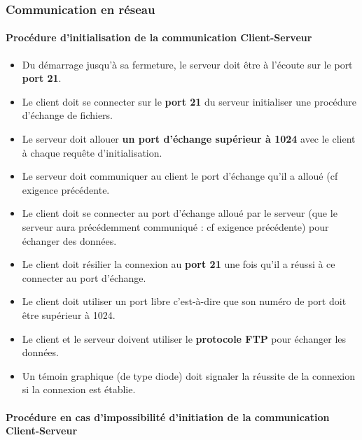 \documentclass[10pt,a4paper]{report}
\begin{document}
\subsubsection{Communication en réseau}

\paragraph{\textbf{Procédure d'initialisation de la communication Client-Serveur}}

\begin{itemize}[label = $\triangleright$]
\item  Du démarrage jusqu'à sa fermeture, le serveur doit être à l'écoute sur le port \textbf{port 21}.

\item Le client doit se connecter sur le \textbf{port 21} du serveur initialiser une procédure d'échange de fichiers.

\item Le serveur doit allouer \textbf{un port d'échange supérieur à 1024} avec le client à chaque requête d'initialisation.

\item Le serveur doit communiquer au client le port d'échange qu'il a alloué (cf exigence précédente.

\item Le client doit se connecter au port d'échange alloué par le serveur (que le serveur aura précédemment communiqué : cf exigence précédente) pour échanger des données.

\item Le client doit résilier la connexion au \textbf{port 21} une fois qu'il a réussi à ce connecter au port d'échange.

\item Le client doit utiliser un port libre c'est-à-dire que son numéro de port doit être supérieur à 1024.

\item Le client et le serveur doivent utiliser le \textbf{protocole FTP} pour échanger les données.

\item Un témoin graphique (de type diode) doit signaler la réussite de la connexion si la connexion est établie. 
\end{itemize}

\paragraph{\textbf{Procédure en cas d'impossibilité d'initiation de la communication Client-Serveur}}
\end{document}
